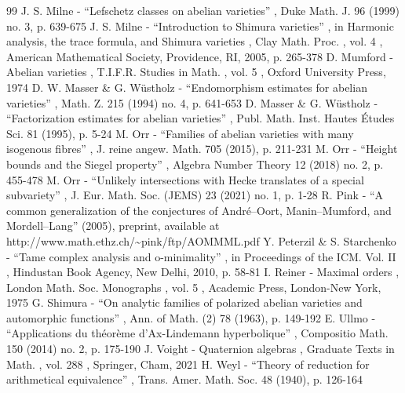\documentclass[11pt]{article}
\numberwithin{equation}{section}
\begin{document}
\begin{thebibliography}{99}
 J. S. Milne - “Lefschetz classes on abelian varieties” , Duke Math. J. 96 (1999) no. 3, p. 639-675
 J. S. Milne - “Introduction to Shimura varieties” , in Harmonic analysis, the trace formula, and Shimura varieties , Clay Math. Proc. , vol. 4 , American Mathematical Society, Providence, RI, 2005, p. 265-378
 D. Mumford - Abelian varieties , T.I.F.R. Studies in Math. , vol. 5 , Oxford University Press, 1974
 D. W. Masser \& G. Wüstholz - “Endomorphism estimates for abelian varieties” , Math. Z. 215 (1994) no. 4, p. 641-653
 D. Masser \& G. Wüstholz - “Factorization estimates for abelian varieties” , Publ. Math. Inst. Hautes Études Sci. 81 (1995), p. 5-24
 M. Orr - “Families of abelian varieties with many isogenous fibres” , J. reine angew. Math. 705 (2015), p. 211-231
 M. Orr - “Height bounds and the Siegel property” , Algebra Number Theory 12 (2018) no. 2, p. 455-478
 M. Orr - “Unlikely intersections with Hecke translates of a special subvariety” , J. Eur. Math. Soc. (JEMS) 23 (2021) no. 1, p. 1-28
 R. Pink - “A common generalization of the conjectures of André–Oort, Manin–Mumford, and Mordell–Lang” (2005), preprint, available at http://www.math.ethz.ch/\textasciitilde{}pink/ftp/AOMMML.pdf
 Y. Peterzil \& S. Starchenko - “Tame complex analysis and o-minimality” , in Proceedings of the ICM. Vol. II , Hindustan Book Agency, New Delhi, 2010, p. 58-81
 I. Reiner - Maximal orders , London Math. Soc. Monographs , vol. 5 , Academic Press, London-New York, 1975
 G. Shimura - “On analytic families of polarized abelian varieties and automorphic functions” , Ann. of Math. (2) 78 (1963), p. 149-192
 E. Ullmo - “Applications du théorème d’Ax-Lindemann hyperbolique” , Compositio Math. 150 (2014) no. 2, p. 175-190
 J. Voight - Quaternion algebras , Graduate Texts in Math. , vol. 288 , Springer, Cham, 2021
 H. Weyl - “Theory of reduction for arithmetical equivalence” , Trans. Amer. Math. Soc. 48 (1940), p. 126-164
\end{thebibliography}
\end{document}
